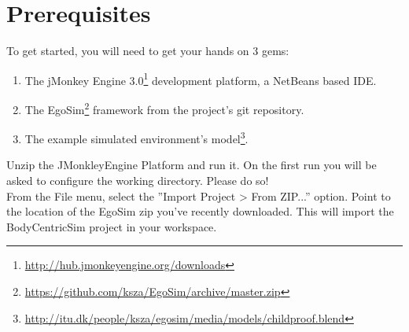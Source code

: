 \section{Prerequisites} %
\label{sec:sd_prerequisites}
To get started, you will need to get your hands on 3 gems:
\begin{enumerate}
	\item The jMonkey Engine 3.0\footnote{\url{http://hub.jmonkeyengine.org/downloads}} development platform, a NetBeans based IDE.
	\item The EgoSim\footnote{\url{https://github.com/ksza/EgoSim/archive/master.zip}} framework from the project's git repository.
	\item The example simulated environment's model\footnote{\url{http://itu.dk/people/ksza/egosim/media/models/childproof.blend}}.
\end{enumerate}

Unzip the JMonkleyEngine Platform and run it. On the first run you will be asked to configure the working directory. Please do so!\\

From the File menu, select the ''Import Project > From ZIP...'' option. Point to the location of the EgoSim zip you've recently downloaded. This will import the BodyCentricSim project in your workspace.
